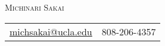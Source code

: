 \documentclass[10pt]{article} %
\begin{document}
\setlength{\parskip}{\baselineskip}%
\pagestyle{empty} %



\begin{center}
	{\huge{\textsc{Michinari Sakai}}}\\%
	\noindent\begin{tabular}{r @{$\quad\bullet\quad$} l}
		\href{mailto:michsakai@ucla.edu}{michsakai@ucla.edu} & 808-206-4357
	\end{tabular}
\end{center}

%


%
\end{document}
